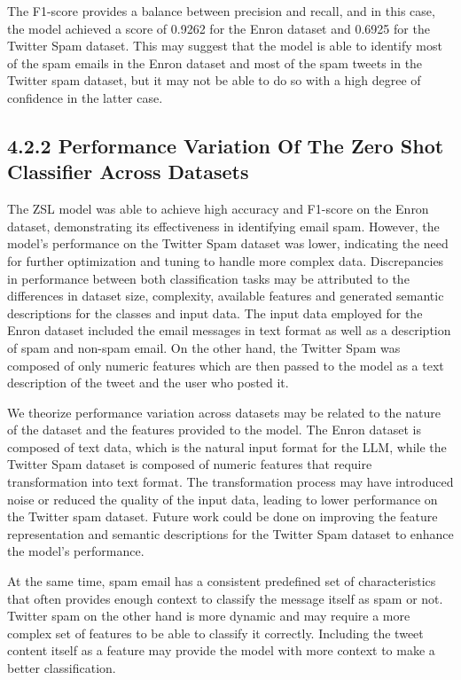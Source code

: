 \documentclass[letterpaper,twocolumn,fleqn]{article}
\begin{document}
The F1-score provides a balance between precision and recall, and in this case, the model achieved a score of 0.9262 for the Enron dataset and 0.6925 for the Twitter Spam dataset. This may suggest that the model is able to identify most of the spam emails in the Enron dataset and most of the spam tweets in the Twitter spam dataset, but it may not be able to do so with a high degree of confidence in the latter case.

\subsection*{4.2.2 Performance Variation Of The Zero Shot Classifier Across Datasets}

The ZSL model was able to achieve high accuracy and F1-score on the Enron dataset, demonstrating its effectiveness in identifying email spam. However, the model's performance on the Twitter Spam dataset was lower, indicating the need for further optimization and tuning to handle more complex data. Discrepancies in performance between both classification tasks may be attributed to the differences in dataset size, complexity, available features and generated semantic descriptions for the classes and input data. The input data employed for the Enron dataset included the email messages in text format as well as a description of spam and non-spam email. On the other hand, the Twitter Spam was composed of only numeric features which are then passed to the model as a text description of the tweet and the user who posted it.

We theorize performance variation across datasets may be related to the nature of the dataset and the features provided to the model. The Enron dataset is composed of text data, which is the natural input format for the LLM, while the Twitter Spam dataset is composed of numeric features that require transformation into text format. The transformation process may have introduced noise or reduced the quality of the input data, leading to lower performance on the Twitter spam dataset. Future work could be done on improving the feature representation and semantic descriptions for the Twitter Spam dataset to enhance the model's performance.

At the same time, spam email has a consistent predefined set of characteristics that often provides enough context to classify the message itself as spam or not. Twitter spam on the other hand is more dynamic and may require a more complex set of features to be able to classify it correctly. Including the tweet content itself as a feature may provide the model with more context to make a better classification.
\end{document}
